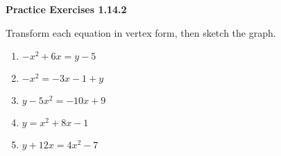 \vspace{1ex}
\noindent\textbf{Practice Exercises 1.14.2}

\vspace{0.75ex}

Transform each equation in vertex form, then sketch the graph.
\begin{multicols}{2}
\begin{enumerate}[label = \color{blue}\arabic*. ]
\item $ -x^{2} + 6x = y - 5 $ 
\item $ -x^{2} = -3x - 1 + y $
\item $ y - 5x^{2} = -10x + 9 $
\item $ y = x^{2} + 8x - 1 $
\item $ y + 12x = 4x^{2} - 7 $
\end{enumerate}
\end{multicols} 


